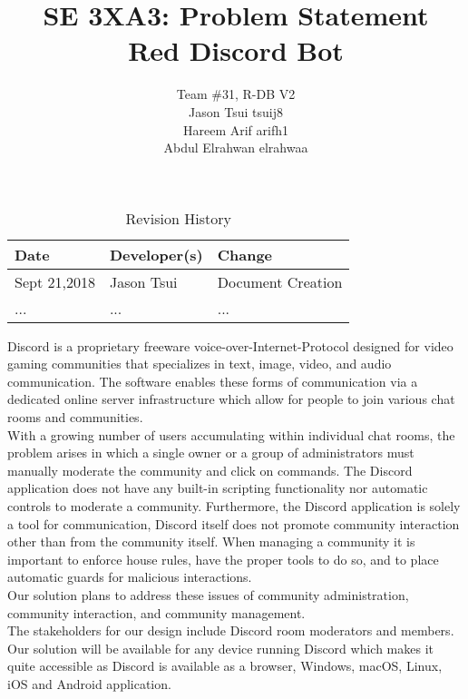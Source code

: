 \documentclass{article}
\title{SE 3XA3: Problem Statement\\Red Discord Bot}
\author{Team \#31, R-DB V2
		\\ Jason Tsui tsuij8
		\\ Hareem Arif arifh1
		\\ Abdul Elrahwan elrahwaa
}
\date{}
\begin{document}
\begin{table}[hp]
\caption{Revision History} \label{TblRevisionHistory}
\begin{tabularx}{\textwidth}{llX}
\toprule
\textbf{Date} & \textbf{Developer(s)} & \textbf{Change}\\
\midrule
Sept 21,2018 & Jason Tsui & Document Creation\\
... & ... & ...\\
\bottomrule
\end{tabularx}
\end{table}

\newpage

\maketitle

Discord is a proprietary freeware voice-over-Internet-Protocol designed for video gaming communities that specializes in text, image, video, and audio communication. The software enables these forms of communication via a dedicated online server infrastructure which allow for people to join various chat rooms and communities. \\


With a growing number of users accumulating within individual chat rooms, the problem arises in which a single owner or a group of administrators must manually moderate the community and click on commands. The Discord application does not have any built-in scripting functionality nor automatic controls to moderate a community. Furthermore, the Discord application is solely a tool for communication, Discord itself does not promote community interaction other than from the community itself. When managing a community it is important to enforce house rules, have the proper tools to do so, and to place automatic guards for malicious interactions. \\

	Our solution plans to address these issues of community administration, community interaction, and community management.\\



The stakeholders for our design include Discord room moderators and members. Our solution will be available for any device running Discord which makes it quite accessible as Discord is available as a browser, Windows, macOS, Linux, iOS and Android application.
\end{document}
